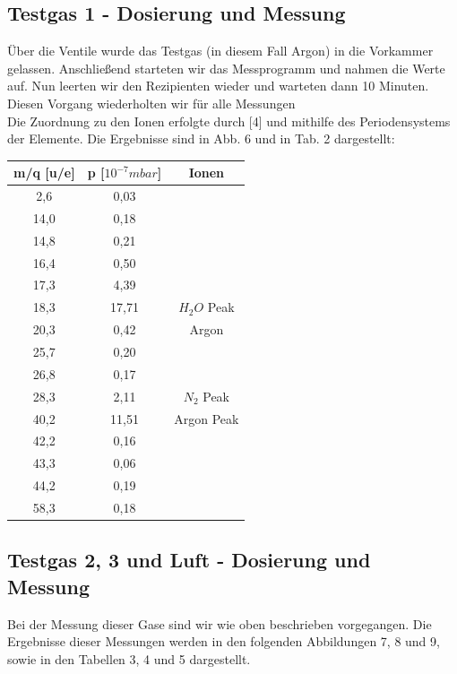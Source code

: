 \subsection{Testgas 1 - Dosierung und Messung}
Über die Ventile wurde das Testgas (in diesem Fall Argon) in die Vorkammer gelassen. Anschließend starteten wir das Messprogramm und nahmen die Werte auf. Nun leerten wir den Rezipienten wieder und warteten dann 10 Minuten. Diesen Vorgang wiederholten wir für alle Messungen\\
Die Zuordnung zu den Ionen erfolgte durch [4] und mithilfe des Periodensystems der Elemente. Die Ergebnisse sind in Abb. 6 und in Tab. 2 dargestellt:\\


\begin{center}
\begin{tabular}{c|c|c}
m/q [u/e] & p [$10^{-7} mbar$] & Ionen\\	
\hline	
2,6 & 0,03	&\\	
14,0 & 0,18	&\\	
14,8 & 0,21	&\\	
16,4 & 0,50	&\\	
17,3 & 4,39	&\\	
18,3 & 17,71 & $H_2O$ Peak\\
20,3 & 0,42	& Argon\\
25,7 & 0,20	&\\
26,8 & 0,17	&\\
28,3 & 2,11	& $N_2$ Peak\\
40,2 & 11,51 & Argon Peak\\
42,2 & 0,16	&\\
43,3 & 0,06	&\\
44,2 & 0,19	&\\
58,3 & 0,18	&\\
\end{tabular}
\end{center}

\subsection{Testgas 2, 3 und Luft - Dosierung und Messung}
Bei der Messung dieser Gase sind wir wie oben beschrieben vorgegangen. Die Ergebnisse dieser Messungen werden in den folgenden Abbildungen 7, 8 und 9, sowie in den Tabellen 3, 4 und 5 dargestellt.

